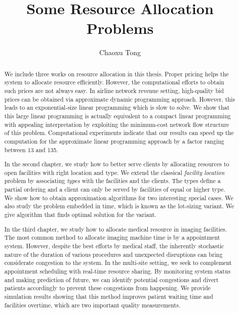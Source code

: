 \documentclass[phd,tocprelim]{cornell}
\title {Some Resource Allocation Problems}
\author {Chaoxu Tong}
\begin{document}
\maketitle
\makecopyright

\begin{abstract}
We include three works on resource allocation in this thesis. Proper pricing
helps the system to allocate resource efficiently. However, the computational
efforts to obtain such prices are not always easy. In airline network revenue
setting, high-quality bid prices can be obtained via approximate dynamic
programming approach. However, this leads to an exponential-size linear programming
which is slow to solve. We show that this large linear programming is actually
equivalent to a compact linear programming with appealing interpretation
by exploiting the minimum-cost network flow structure of this problem.
Computational experiments indicate that our results can speed up the computation
for the approximate linear programming approach by a factor ranging between 13 and 135.

In the second chapter, we study how to better serve clients by allocating resources
to open facilities with right location and type. We extend the classical \textit{facility location}
problem by associating \textit{types} with the facilities and the clients. The types define a partial
ordering and a client can only be served by facilities of equal or higher type. We show
how to obtain approximation algorithms for two interesting special cases.
We also study the problem embedded in time, which is known as the lot-sizing variant.
We give algorithm that finds optimal solution for the variant.

In the third chapter, we study how to allocate medical resource in imaging facilities.
The most common method to allocate imaging machine time is by a appointment system.
However, despite the best efforts by medical staff, the inherently stochastic nature of the duration of various procedures and
unexpected disruptions can bring considerate congestion to the system. In the multi-site setting,
we seek to complement appointment scheduling with real-time resource sharing.
By monitoring system status and making prediction of future, we can identify
potential congestions and divert patients accordingly to prevent these congestions
from happening. We provide simulation results showing that this method improves
patient waiting time and facilities overtime, which are two important quality measurements.
\end{abstract}
\end{document}
